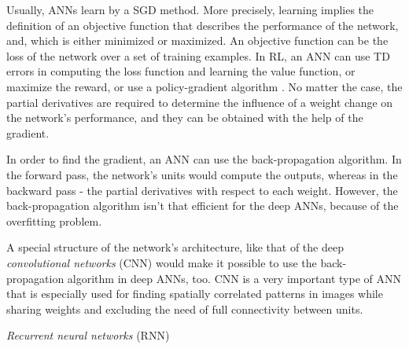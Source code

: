 Usually, ANNs learn by a SGD method. More precisely, learning implies the definition of an objective function that describes the performance of the network, and, which is either minimized or maximized. An objective function can be the loss of the network over a set of training examples. In RL, an ANN can use TD errors in computing the loss function and learning the value function, or maximize the reward, or use a policy-gradient algorithm \cite{Sutton}. No matter the case, the partial derivatives are required to determine the influence of a weight change on the network's performance, and they can be obtained with the help of the gradient.

In order to find the gradient, an ANN can use the back-propagation algorithm. In the forward pass, the network's units would compute the outputs, whereas in the backward pass - the partial derivatives with respect to each weight. However, the back-propagation algorithm isn't that efficient for the deep ANNs, because of the overfitting problem.

A special structure of the network's architecture, like that of the deep \textit{convolutional networks} (CNN) would make it possible to use the back-propagation algorithm in deep ANNs, too. CNN is a very important type of ANN that is especially used for finding spatially correlated patterns in images while sharing weights and excluding the need of full connectivity between units.



\textit{Recurrent neural networks} (RNN)


